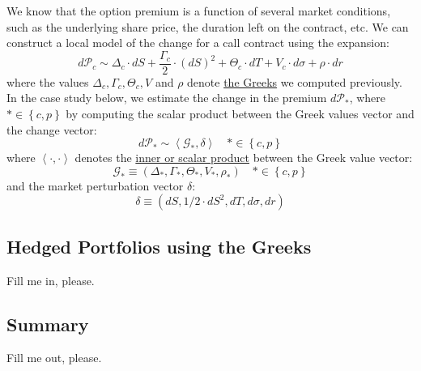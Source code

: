 \documentclass[11pt]{article}
\theoremstyle{definition}
\begin{document}
We know that the option premium is a function of several market conditions, such as the underlying share price, the duration left on the contract, etc. We can construct a local model of the change for a call contract using the expansion:
\begin{equation}
d\mathcal{P}_{c} \sim \Delta_{c}\cdot{d}{S}+\frac{\Gamma_{c}}{2}\cdot\left(d{S}\right)^2 + \Theta_{c}\cdot{d}{T}+V_{c}\cdot{d}\sigma + \rho\cdot{d}{r}
\end{equation}
where the values $\Delta_{c}, \Gamma_{c},  \Theta_{c}, V$ and $\rho$ denote \href{https://en.wikipedia.org/wiki/en:Greeks_(finance)?variant=zh-tw}{the Greeks} we computed previously. In the case study below, we estimate the change in the premium $d\mathcal{P}_{*}$, where $*\in\left\{c,p\right\}$ by computing the scalar product between the Greek values vector and the change vector:
\begin{equation}
d\mathcal{P}_{*}\sim\left<\mathcal{G}_{*},\delta\right>\quad{*\in\left\{c,p\right\}}
\end{equation}
where $\left<\cdot,\cdot\right>$ denotes the \href{https://en.wikipedia.org/wiki/Inner_product_space}{inner or scalar product} between the Greek value vector:
\begin{equation}
\mathcal{G}_{*}\equiv\left(\Delta_{*},\Gamma_{*},\Theta_{*},V_{*},\rho_{*}\right)\quad{*\in\left\{c,p\right\}}
\end{equation}
and the market perturbation vector $\delta$:
\begin{equation}
\delta\equiv\left(dS,1/2\cdot{dS}^{2},dT,d\sigma,dr\right)
\end{equation}

\subsection{Hedged Portfolios using the Greeks}
Fill me in, please.

\subsection*{Summary}
Fill me out, please.



\clearpage
\printindex
\end{document}
